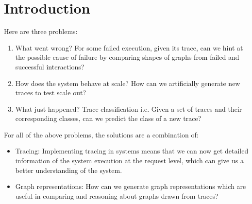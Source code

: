 \section{Introduction}


Here are three problems: 
\begin{enumerate}
\item What went wrong? For some failed execution, given its trace, can we hint at the possible cause of failure by comparing shapes of graphs from failed and successful interactions?
\item How does the system behave at scale? How can we artificially generate new traces to test scale out? 
\item What just happened? Trace classification i.e. Given a set of traces and their corresponding classes, can we predict the class of a new trace? 
\end{enumerate}

For all of the above problems, the solutions are a combination of:
\begin{itemize}
\item Tracing: Implementing  tracing in systems means that we can now get detailed information of the system execution at the request level, which can give us a better understanding of the system.
\item Graph representations: How can we generate graph representations which are useful in comparing and reasoning about graphs drawn from traces?
\end{itemize}
\ash{}

